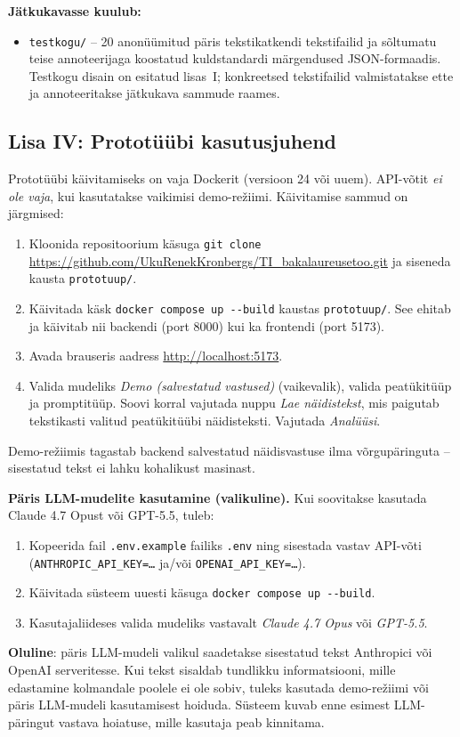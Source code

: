 \textbf{Jätkukavasse kuulub:}
\begin{itemize}
    \item \texttt{testkogu/} -- 20 anonüümitud päris tekstikatkendi tekstifailid ja sõltumatu teise annoteerijaga koostatud kuldstandardi märgendused JSON-formaadis. Testkogu disain on esitatud lisas~I; konkreetsed tekstifailid valmistatakse ette ja annoteeritakse jätkukava sammude raames.
\end{itemize}

\clearpage
\subsection*{Lisa IV: Prototüübi kasutusjuhend} \label{lisa:juhend}

Prototüübi käivitamiseks on vaja Dockerit (versioon 24 või uuem). API-võtit \emph{ei ole vaja}, kui kasutatakse vaikimisi demo-režiimi. Käivitamise sammud on järgmised:

\begin{enumerate}
    \item Kloonida repositoorium käsuga \texttt{git clone} \url{https://github.com/UkuRenekKronbergs/TI_bakalaureusetoo.git} ja siseneda kausta \texttt{prototuup/}.
    \item Käivitada käsk \texttt{docker compose up -{}-build} kaustas \texttt{prototuup/}. See ehitab ja käivitab nii backendi (port 8000) kui ka frontendi (port 5173).
    \item Avada brauseris aadress \url{http://localhost:5173}.
    \item Valida mudeliks \emph{Demo (salvestatud vastused)} (vaikevalik), valida peatükitüüp ja promptitüüp. Soovi korral vajutada nuppu \emph{Lae näidistekst}, mis paigutab tekstikasti valitud peatükitüübi näidisteksti. Vajutada \emph{Analüüsi}.
\end{enumerate}

Demo-režiimis tagastab backend salvestatud näidisvastuse ilma võrgupäringuta -- sisestatud tekst ei lahku kohalikust masinast.

\textbf{Päris LLM-mudelite kasutamine (valikuline).} Kui soovitakse kasutada Claude 4.7 Opust või GPT-5.5, tuleb:

\begin{enumerate}
    \item Kopeerida fail \texttt{.env.example} failiks \texttt{.env} ning sisestada vastav API-võti (\texttt{ANTHROPIC\_API\_KEY=\dots} ja/või \texttt{OPENAI\_API\_KEY=\dots}).
    \item Käivitada süsteem uuesti käsuga \texttt{docker compose up -{}-build}.
    \item Kasutajaliideses valida mudeliks vastavalt \emph{Claude 4.7 Opus} või \emph{GPT-5.5}.
\end{enumerate}

\textbf{Oluline}: päris LLM-mudeli valikul saadetakse sisestatud tekst Anthropici või OpenAI serveritesse. Kui tekst sisaldab tundlikku informatsiooni, mille edastamine kolmandale poolele ei ole sobiv, tuleks kasutada demo-režiimi või päris LLM-mudeli kasutamisest hoiduda. Süsteem kuvab enne esimest LLM-päringut vastava hoiatuse, mille kasutaja peab kinnitama.
